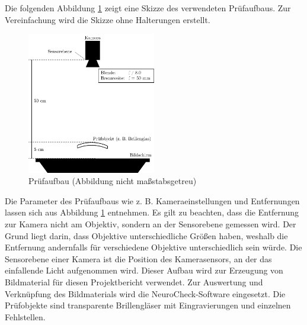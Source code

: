 Die folgenden Abbildung \ref{img:pruefaufbau} zeigt eine Skizze des verwendeten Prüfaufbaus.
Zur Vereinfachung wird die Skizze ohne Halterungen erstellt.

\begin{figure}[H]
	\centering
	\includegraphics[width=0.5\textwidth]{03_sichtpruefungDurchLichtstreuung/pruefaufbau/figures/aufbau}
	\caption[Prüfaufbau]{Prüfaufbau (Abbildung nicht maßstabsgetreu)}
	\label{img:pruefaufbau}
\end{figure}

\noindent
Die Parameter des Prüfaufbaus wie z. B. Kameraeinstellungen und Entfernungen lassen sich aus Abbildung \ref{img:pruefaufbau} entnehmen.
Es gilt zu beachten, dass die Entfernung zur Kamera nicht am Objektiv, sondern an der Sensorebene gemessen wird.
Der Grund liegt darin, dass Objektive unterschiedliche Größen haben, weshalb die Entfernung andernfalls für verschiedene Objektive unterschiedlich sein würde.
Die Sensorebene einer Kamera ist die Position des Kamerasensors, an der das einfallende Licht aufgenommen wird.
Dieser Aufbau wird zur Erzeugung von Bildmaterial für diesen Projektbericht verwendet.
Zur Auswertung und Verknüpfung des Bildmaterials wird die NeuroCheck-Software eingesetzt.
Die Prüfobjekte sind transparente Brillengläser mit Eingravierungen und einzelnen Fehlstellen.